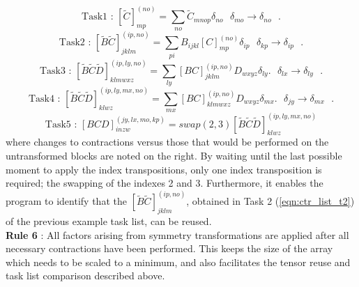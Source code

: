 \begin{equation*}
\text{Task1 \ : \ \ }
[\tilde{C}]^{(no)}_{mp} = \sum_{no} \tilde{C}_{mnop}\delta_{no}   \text{ \ \ \ $\delta_{mo} \rightarrow \delta_{no}$ }.
\end{equation*}
\begin{equation*}
\text{Task2 \ : \ \ }
[\tilde{B}\tilde{C}]^{(ip,no)}_{jklm} = \sum_{pi} B_{ijkl}[C]_{mp}^{(no)}\delta_{ip} 
\text{ \ \ \ $\delta_{kp} \rightarrow \delta_{ip}$ }.
\end{equation*}
\begin{equation*}
\text{Task3 \ : \ \ }
[\tilde{B}\tilde{C}\tilde{D}]^{(ip,ly,no)}_{klmwxz} = \sum_{ly} [BC]^{(ip,no)}_{jklm} D_{wxyz}\delta_{ly}. 
\text{ \ \ \ $\delta_{lx} \rightarrow \delta_{ly}$ }.
\end{equation*}
\begin{equation*}
\text{Task4 \ : \ \ }
[\tilde{B}\tilde{C}\tilde{D}]^{(ip,ly,mx,no)}_{klwz} = \sum_{mx} [BC]^{(ip,no)}_{klmwxz} D_{wxyz}\delta_{mx}.
\text{ \ \ \ $\delta_{jy} \rightarrow \delta_{mx}$ }.
\end{equation*}
\begin{equation*}
\text{Task5 \ : \ \ }
[BCD]^{(jy,lx,mo,kp)}_{inzw} = swap(2,3) [\tilde{B}\tilde{C}\tilde{D}]^{(ip,ly,mx,no)}_{klwz}
\end{equation*}
where changes to contractions versus those that would be performed on the
untransformed blocks are noted on the right. By waiting until the last
possible moment to apply the index transpositions,
only one index transposition is required; the swapping of the indexes 2 and 3.
Furthermore, it enables the program to identify that the $[\tilde{B}\tilde{C}]^{(ip,no)}_{jklm}$,
obtained in Task 2 (\ref{eqn:ctr_list_t2}) of the previous example task list, can be reused.\\ 
 
\noindent \textbf{Rule 6} : All factors
arising from symmetry transformations are applied after all necessary
contractions have been performed. This keeps the size of the array which needs
to be scaled to a minimum, and also facilitates the tensor reuse and task list comparison described above.
